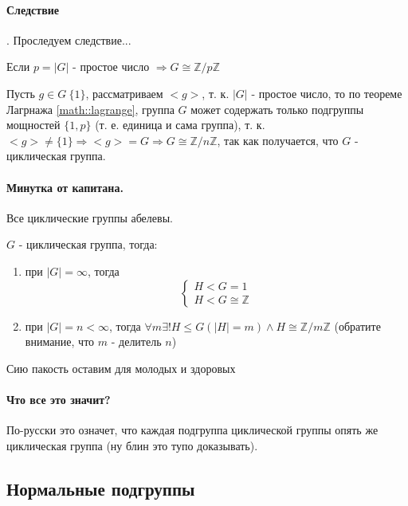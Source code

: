 \paragraph{Следствие}. Проследуем следствие...

Если $p = \left|G\right|$ - простое число $\Rightarrow G \cong \mathbb{Z}/{p\mathbb{Z}}$

\begin{Proof}
Пусть $g \in G \ \{1\}$, рассматриваем $<g>$, т. к. $\left|G\right|$ - простое число, то по теореме Лагрнажа \ref{math::lagrange}, группа $G$ может содержать только подгруппы мощностей $\{1, p\}$ (т. е. единица и сама группа), т. к. $<g> \not= \{1\} \Rightarrow <g> = G \Rightarrow G \cong \mathbb{Z}/{n\mathbb{Z}}$, так как получается, что $G$ - циклическая группа.
\end{Proof}

\paragraph{Минутка от капитана.} Все циклические группы абелевы.

\begin{Th}
$G$ - циклическая группа, тогда:
\begin{enumerate}
\item при $\left|G\right| = \infty$, тогда
\[
\begin{cases}
	H < G = {1} \\
	H < G \cong \mathbb{Z}
\end{cases}
\]

\item при $\left|G\right| = n < \infty$, тогда $\forall m \exists ! H \le G \left( \left|H\right|=m\right) \land H \cong \mathbb{Z}/{m\mathbb{Z}}$ (обратите внимание, что $m$ - делитель $n$)
\end{enumerate}
\end{Th}

\begin{Proof}
Сию пакость оставим для молодых и здоровых
\end{Proof}

\paragraph{Что все это значит?} По-русски это означет, что каждая подгруппа циклической группы опять же циклическая группа (ну блин это тупо доказывать).

\subsection{Нормальные подгруппы}

